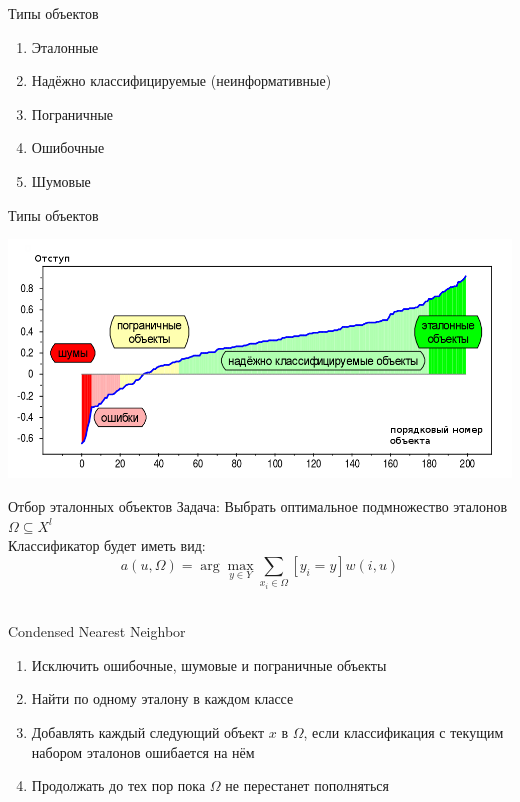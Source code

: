 \documentclass[10pt]{beamer}
\begin{document}
\begin{frame}{Типы объектов}
	\begin{enumerate} [<+->]
		\item Эталонные
		\item Надёжно классифицируемые (неинформативные)
		\item Пограничные	
		\item Ошибочные	
		\item Шумовые	
	\end{enumerate}
\end{frame}

{
\begin{frame}{Типы объектов}
  \begin{center}
    \includegraphics[width=\textwidth, keepaspectratio]{images/margin}
  \end{center}
\end{frame}
}

{
\begin{frame}{Отбор эталонных объектов}
	\alert{Задача}: Выбрать оптимальное подмножество эталонов $\Omega\subseteq X^l$\\ 
    \bigbreak
	Классификатор будет иметь вид:\\
	$${a(u, \Omega) = \arg\max\limits_{y \in Y} \sum\limits_{x_i \in \Omega} [y_i = y]w(i, u) }$$\\
\end{frame}
}

\begin{frame}{Condensed Nearest Neighbor}
	\begin{enumerate}
	  \item Исключить ошибочные, шумовые и пограничные объекты
	  \item Найти по одному эталону в каждом классе
		\item Добавлять каждый следующий объект $x$ в $\Omega$, если классификация с текущим набором эталонов ошибается на нём
		\item Продолжать до тех пор пока $\Omega$ не перестанет пополняться
	\end{enumerate}
\end{frame}
\end{document}
